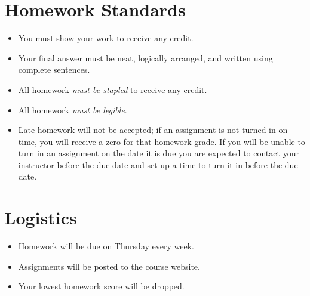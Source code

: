 \documentclass[11pt]{article}
\begin{document}
\drawtitle

\section*{Homework Standards}

\begin{itemize}
\item You must show your work to receive any credit.
\item Your final answer must be neat, logically arranged, and written
  using complete sentences.

\item All homework \textit{must be stapled} to receive any credit.
  
\item All homework \textit{must be legible}.
  
\item Late homework will not be accepted; if an assignment is not
  turned in on time, you will receive a zero for that homework
  grade. If you will be unable to turn in an assignment on the date it
  is due you are expected to contact your instructor before the due
  date and set up a time to turn it in before the due date.
\end{itemize}

\section*{Logistics}

\begin{itemize}
\item Homework will be due on Thursday every week.
\item Assignments will be posted to the course website.
\item Your lowest homework score will be dropped.
\end{itemize}
\end{document}
